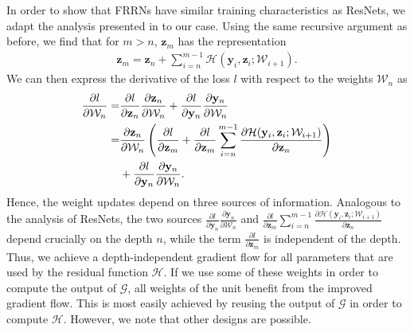 \documentclass[10pt,twocolumn,letterpaper]{article}
\newcommand{\bz}{\mathbf{z}}
\newcommand{\by}{\mathbf{y}}
\begin{document}
In order to show that FRRNs have similar training characteristics as ResNets, we adapt the analysis presented in \cite{He16ECCV} to our case.
Using the same recursive argument as before, we find that for $m > n$, $\bz_m$ has the representation
\begin{align}
	\bz_m = \bz_n + \sum_{i = n}^{m - 1} \mathcal{H}(\by_i, \bz_i; \mathcal{W}_{i+1}).
\end{align}
We can then express the derivative of the loss $l$ with respect to the weights $\mathcal{W}_{n}$ as
\begin{align}
	\frac{\partial l}{\partial \mathcal{W}_{n}} =& \frac{\partial l}{\partial \bz_n}\frac{\partial \bz_n}{\partial \mathcal{W}_{n}} + \frac{\partial l}{\partial \by_n}\frac{\partial \by_n}{\partial \mathcal{W}_{n}} \notag \\
	=&\frac{\partial \bz_n}{\partial \mathcal{W}_{n}} \left( \frac{\partial l}{\partial \bz_m} + \frac{\partial l}{\partial \bz_m} \sum_{i = n}^{m - 1} \frac{\partial \mathcal{H}(\by_i, \bz_i; \mathcal{W}_{i+1})}{\partial \bz_n} \right) \notag \\
	& +\frac{\partial l}{\partial \by_n}\frac{\partial \by_n}{\partial \mathcal{W}_{n}}.
\end{align}
Hence, the weight updates depend on three sources of information.
Analogous to the analysis of ResNets, the two sources $\frac{\partial l}{\partial \by_n}\frac{\partial \by_n}{\partial \mathcal{W}_{n}}$ and $\frac{\partial l}{\partial \bz_m} \sum_{i = n}^{m - 1} \frac{\partial \mathcal{H}(\by_i, \bz_i; \mathcal{W}_{i+1})}{\partial \bz_n}$ depend crucially on the depth $n$, while the term $\frac{\partial l}{\partial \bz_m}$ is independent of the depth.
Thus, we achieve a depth-independent gradient flow for all parameters that are used by the residual function $\mathcal{H}$.
If we use some of these weights in order to compute the output of $\mathcal{G}$, all weights of the unit benefit from the improved gradient flow.
This is most easily achieved by reusing the output of $\mathcal{G}$ in order to compute $\mathcal{H}$.
However, we note that other designs are possible.
\end{document}
